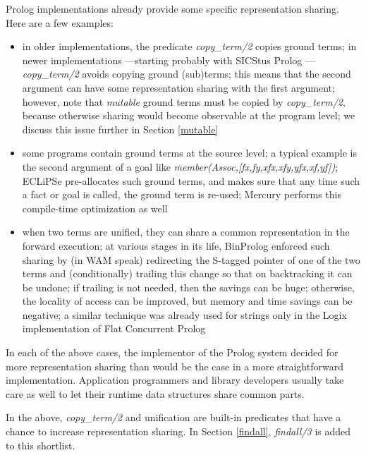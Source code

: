 \documentclass{tlp}
\begin{document}
Prolog implementations already provide some specific representation
sharing. Here are a few examples:

\begin{sloppypar}
\begin{itemize}

\item
in older implementations, the predicate {\em copy\_term/2} copies
ground terms; in newer implementations ---starting probably with
SICStus Prolog \cite{matsphd}--- {\em copy\_term/2} avoids copying
ground (sub)terms; this means that the second argument can have some
representation sharing with the first argument; however, note that
{\em mutable} ground terms must be copied by {\em copy\_term/2},
because otherwise sharing would become observable at the program
level; we discuss this issue further in Section \ref{mutable}

\item
some programs contain ground terms at the source level; a typical
example is the second argument of a goal like {\em
  member(Assoc,[fx,fy,xfx,xfy,yfx,xf,yf])}; ECLiPSe
\cite{Wallace97eclipse} pre-allocates such ground terms, and makes
sure that any time such a fact or goal is called, the ground term is
re-used; Mercury performs this compile-time optimization as well

\item
when two terms are unified, they can share a common representation in
the forward execution; at various stages in its life, BinProlog
\cite{Tarau91:JAP} enforced such sharing by (in WAM speak) redirecting
the S-tagged pointer of one of the two terms and (conditionally)
trailing this change so that on backtracking it can be undone; if
trailing is not needed, then the savings can be huge; otherwise, the
locality of access can be improved, but memory and time savings can be
negative; a similar technique was already used for strings only in the
Logix implementation of Flat Concurrent Prolog \cite{logixFCP}

\end{itemize}
\end{sloppypar}

In each of the above cases, the implementor of the Prolog system
decided for more representation sharing than would be the case in
a more straightforward implementation.
Application programmers and library developers usually take care as
well to let their runtime data structures share common parts.



In the above, {\em copy\_term/2} and unification are built-in
predicates that have a chance to increase representation sharing. In
Section \ref{findall}, {\em findall/3} is added to this shortlist.
\end{document}
